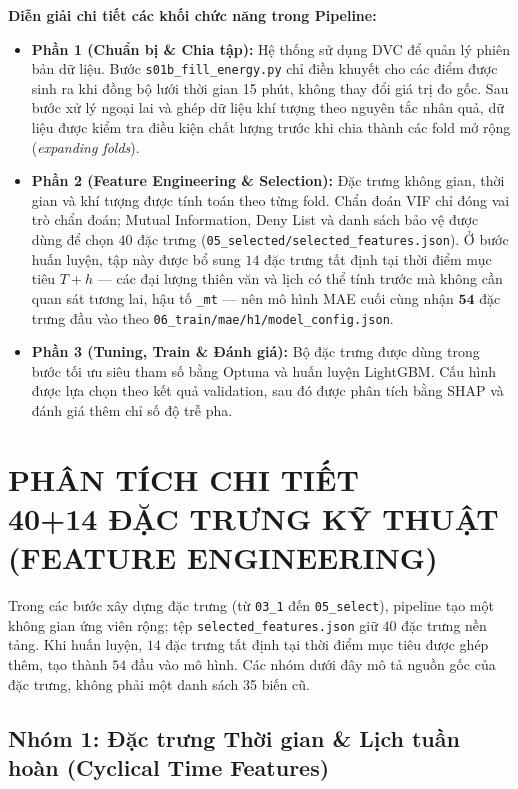 \documentclass[12pt,a4paper]{article}
\begin{document}
\textbf{Diễn giải chi tiết các khối chức năng trong Pipeline:}
\begin{itemize}
    \item \textbf{Phần 1 (Chuẩn bị \& Chia tập):} Hệ thống sử dụng DVC để quản lý phiên bản dữ liệu. Bước \texttt{s01b\_fill\_energy.py} chỉ điền khuyết cho các điểm được sinh ra khi đồng bộ lưới thời gian 15 phút, không thay đổi giá trị đo gốc. Sau bước xử lý ngoại lai và ghép dữ liệu khí tượng theo nguyên tắc nhân quả, dữ liệu được kiểm tra điều kiện chất lượng trước khi chia thành các fold mở rộng (\textit{expanding folds}).
    \item \textbf{Phần 2 (Feature Engineering \& Selection):} Đặc trưng không gian, thời gian và khí tượng được tính toán theo từng fold. Chẩn đoán VIF chỉ đóng vai trò chẩn đoán; Mutual Information, Deny List và danh sách bảo vệ được dùng để chọn $40$ đặc trưng (\texttt{05\_selected/selected\_features.json}). Ở bước huấn luyện, tập này được bổ sung $14$ đặc trưng tất định tại thời điểm mục tiêu $T+h$ --- các đại lượng thiên văn và lịch có thể tính trước mà không cần quan sát tương lai, hậu tố \texttt{\_mt} --- nên mô hình MAE cuối cùng nhận $\mathbf{54}$ đặc trưng đầu vào theo \texttt{06\_train/mae/h1/model\_config.json}.
    \item \textbf{Phần 3 (Tuning, Train \& Đánh giá):} Bộ đặc trưng được dùng trong bước tối ưu siêu tham số bằng Optuna và huấn luyện LightGBM. Cấu hình được lựa chọn theo kết quả validation, sau đó được phân tích bằng SHAP và đánh giá thêm chỉ số độ trễ pha.
\end{itemize}

\section[PHÂN TÍCH 40+14 ĐẶC TRƯNG KỸ THUẬT]{PHÂN TÍCH CHI TIẾT\\40+14 ĐẶC TRƯNG KỸ THUẬT (FEATURE ENGINEERING)}

Trong các bước xây dựng đặc trưng (từ \texttt{03\_1} đến \texttt{05\_select}), pipeline tạo một không gian ứng viên rộng; tệp \texttt{selected\_features.json} giữ $40$ đặc trưng nền tảng. Khi huấn luyện, $14$ đặc trưng tất định tại thời điểm mục tiêu được ghép thêm, tạo thành $54$ đầu vào mô hình. Các nhóm dưới đây mô tả nguồn gốc của đặc trưng, không phải một danh sách 35 biến cũ.

\subsection{Nhóm 1: Đặc trưng Thời gian \& Lịch tuần hoàn (Cyclical Time Features)}
\end{document}

